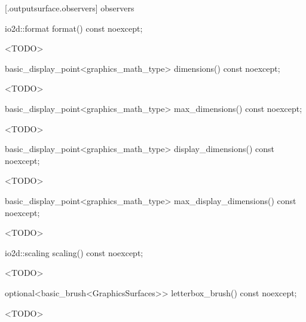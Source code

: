  [\iotwod.outputsurface.observers] { observers}

%
\begin{itemdecl}
io2d::format format() const noexcept;
\end{itemdecl}
\begin{itemdescr}
\pnum
\returns
<TODO>
\end{itemdescr}

%
\begin{itemdecl}
basic_display_point<graphics_math_type> dimensions() const noexcept;
\end{itemdecl}
\begin{itemdescr}
\pnum
\returns
<TODO>
\end{itemdescr}

%
\begin{itemdecl}
basic_display_point<graphics_math_type> max_dimensions() const noexcept;
\end{itemdecl}
\begin{itemdescr}
\pnum
\returns
<TODO>
\end{itemdescr}

%
\begin{itemdecl}
basic_display_point<graphics_math_type> display_dimensions() const noexcept;
\end{itemdecl}
\begin{itemdescr}
\pnum
\returns
<TODO>
\end{itemdescr}

%
\begin{itemdecl}
basic_display_point<graphics_math_type> max_display_dimensions() const noexcept;
\end{itemdecl}
\begin{itemdescr}
\pnum
\returns
<TODO>
\end{itemdescr}

%
\begin{itemdecl}
io2d::scaling scaling() const noexcept;
\end{itemdecl}
\begin{itemdescr}
\pnum
\returns
<TODO>
\end{itemdescr}

%
\begin{itemdecl}
optional<basic_brush<GraphicsSurfaces>> letterbox_brush() const noexcept;
\end{itemdecl}
\begin{itemdescr}
\pnum
\returns
<TODO>
\end{itemdescr}

